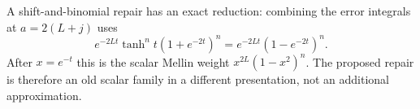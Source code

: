 A shift-and-binomial repair has an exact reduction: combining the error
integrals at $a=2(L+j)$ uses
\[
 e^{-2Lt}\tanh^n t(1+e^{-2t})^n
        =e^{-2Lt}(1-e^{-2t})^n.
\]
After $x=e^{-t}$ this is the scalar Mellin weight
$x^{2L}(1-x^2)^n$. The proposed repair is therefore an old scalar
family in a different presentation, not an additional approximation.
